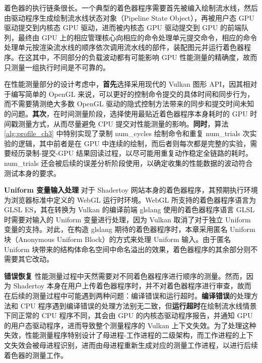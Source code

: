 { 着色器的执行链条很长。一个典型的着色器程序需要首先被编入绘制流水线，然后由驱动程序生成绘制流水线状态对象（Pipeline State Object），再被用户态 GPU 驱动提交到内核态 GPU 驱动，进而被内核态 GPU 驱动提交到 GPU 的前端队列，最终由 GPU 上的相应管理核心向相应的命令处理单元提交命令，相应的命令处理单元按渲染流水线的顺序依次调用流水线的部件，装配图元并运行着色器程序。在这其中，不同部分的负载波动都有可能影响 GPU 性能测量的精确度，故而只测量一组执行时间是不可靠的。

在性能测量部分的设计考虑中，{\bf 首先}选择采用现代的 Vulkan 图形 API，因其相对于编写简单的 OpenGL 来说，可以更好的控制命令提交的具体时间和同步行为，而不需要猜测绝大多数 OpenGL 驱动的隐式控制方法带来的同步和提交时间未知的问题。{\bf 其次}，在时间测量阶段，选择使用最贴近着色器程序本身耗时的 GPU 时间戳测量方式，从而尽量避免 CPU 提交对性能测量的影响。{\bf 同时}，算法 \ref{alg:profile_ch3} 中特别实现了录制 {num\_cycles} 绘制命令和重复 {num\_trials} 次实验的逻辑，其中前者是在 GPU 中连续的绘制，而后者则每次都是完整的实验，需要经历录制-提交-GPU 结果回读过程，以尽可能用重复动作稳定全链路的耗时。{num\_trials} 还会被后续的误差分析阶段使用，以确定收集的性能数据的波动符合测试本身的要求。

{\bf Uniform 变量输入处理} 对于 Shadertoy 网站本身的着色器程序，其预期执行环境为浏览器标准中定义的 WebGL 运行时环境\cite{WebGL}。WebGL 所支持的着色器程序语言为 GLSL ES，其在转换为 Vulkan 的编译前端 glslang 使用的着色器程序语言 GLSL 时需要对输入的 Uniform 变量进行处理，因为 Vulkan 取消了对于独立 Uniform 变量的支持。对此，在构造 glslang 期待的着色器程序时，本章采用匿名 Uniform 块（Anonymous Uniform Block）的方式来处理 Uniform 输入。由于匿名 Uniform 块带来的结构体命名空间中命名溢出的效果，着色器程序的其余部分则不需要其它改动。

{\bf 错误恢复} 性能测量过程中天然需要对不同着色器程序进行顺序的测量。然而，因为 Shadertoy 本身在用户上传着色器程序时，并不对着色器程序进行审查，故而在后续的测量过程中可能遇到两种问题：编译错误和运行超时。{\bf 编译错误}的处理方法和 CPU 程序遇到编译错误的处理方法别无二致，但{\bf 运行超时}在绘制流水线情景下同正常的 CPU 程序不同，其会由 GPU 的内核态驱动程序报告，并通知 GPU 的用户态驱动程序，进而导致整个测量程序的 Vulkan 上下文失效。为了处理这种失效，性能测量程序特别设计了母进程-工作进程的二级架构，而工作进程的上下文失效会被母进程识别，进而由母进程重新生成对应的测量工作进程，以进行后续着色器的测量工作。

}

